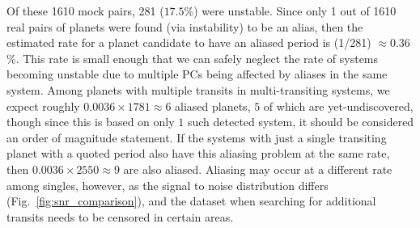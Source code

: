 \documentclass{aastex62}
\begin{document}
{Of these 1610 mock pairs, 281 ($17.5$\%) were unstable. Since only 1 out of 1610 real pairs of planets were found (via instability) to be an alias, then the estimated rate for a planet candidate to have an aliased period is (1/281) $\approx 0.36$\%.  
This rate is small enough that we can safely neglect the rate of systems becoming unstable due to multiple PCs being affected by  aliases in the same system.   
%
Among planets with multiple transits in multi-transiting systems, we expect roughly $0.0036\times1781 \approx 6$ aliased planets, $5$ of which are yet-undiscovered, though since this is based on only $1$ such detected system, it should be considered an order of magnitude statement. If the systems with just a single transiting planet with a quoted period also have this aliasing problem at the same rate, then $0.0036\times2550 \approx 9$} are also aliased.  Aliasing may occur at a different rate among singles, however, as the signal to noise distribution differs (Fig.~\ref{fig:snr_comparison}), and the dataset when searching for additional transits needs to be censored in certain areas. 

\end{document}
